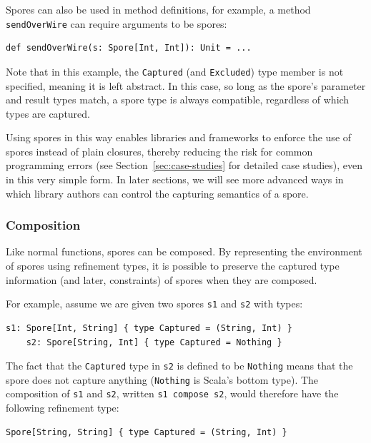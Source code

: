 \documentclass{llncs}
\begin{document}
Spores can also be used in method definitions, for example, a method \verb|sendOverWire| can require arguments to be spores:

\begin{lstlisting}[numbers=none]
    def sendOverWire(s: Spore[Int, Int]): Unit = ...
\end{lstlisting}

Note that in this example, the \verb|Captured| (and \verb|Excluded|) type
member is not specified, meaning it is left abstract. In this case, so long as
the spore's parameter and result types match, a spore type is always
compatible, regardless of which types are captured.

Using spores in this way enables libraries and frameworks to enforce the use
of spores instead of plain closures, thereby reducing the risk for common
programming errors (see Section~\ref{sec:case-studies} for detailed case
studies), even in this very simple form. In later sections, we will see more
advanced ways in which library authors can control the capturing semantics of
a spore.

\subsubsection{Composition}

Like normal functions, spores can be composed. By representing the environment
of spores using refinement types, it is possible to preserve the captured type
information (and later, constraints) of spores when they are composed.

For example, assume we are given two spores \verb|s1| and \verb|s2| with types:

\begin{lstlisting}[numbers=none]
    s1: Spore[Int, String] { type Captured = (String, Int) }
    s2: Spore[String, Int] { type Captured = Nothing }
\end{lstlisting}

The fact that the \verb|Captured| type in \verb|s2| is defined to be
\verb|Nothing| means that the spore does not capture anything (\verb|Nothing|
is Scala's bottom type). The composition of \verb|s1| and \verb|s2|, written
\verb|s1 compose s2|, would therefore have the following refinement type:

\begin{lstlisting}[numbers=none]
    Spore[String, String] { type Captured = (String, Int) }
\end{lstlisting}
\end{document}
